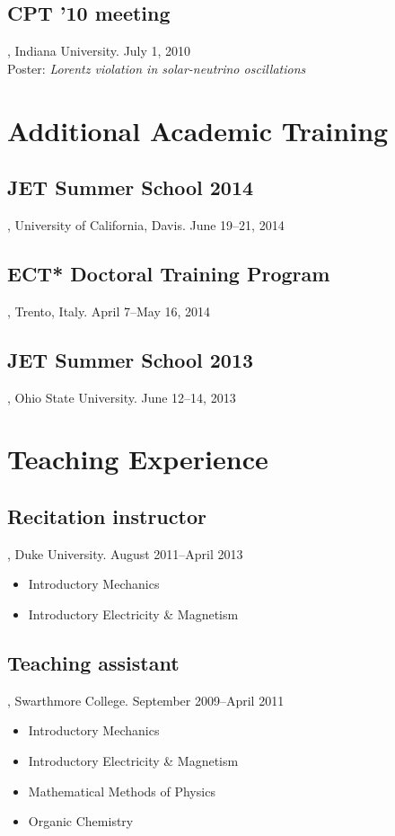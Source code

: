 \documentclass[letterpaper,10pt]{article}
\begin{document}
\subsection{CPT '10 meeting}, Indiana University. \hfill July 1, 2010 \\
Poster: \emph{Lorentz violation in solar-neutrino oscillations}



\section{Additional Academic Training}

\subsection{JET Summer School 2014}, University of California, Davis. \hfill June 19--21, 2014

\subsection{ECT* Doctoral Training Program}, Trento, Italy. \hfill April 7--May 16, 2014

\subsection{JET Summer School 2013}, Ohio State University. \hfill June 12--14, 2013



\section{Teaching Experience}

\subsection{Recitation instructor}, Duke University. \hfill August 2011--April 2013

\begin{itemize}
  \item Introductory Mechanics
  \item Introductory Electricity \& Magnetism
\end{itemize}


\subsection{Teaching assistant}, Swarthmore College. \hfill September 2009--April 2011

\begin{itemize}
  \item Introductory Mechanics
  \item Introductory Electricity \& Magnetism
  \item Mathematical Methods of Physics
  \item Organic Chemistry
\end{itemize}
\end{document}
